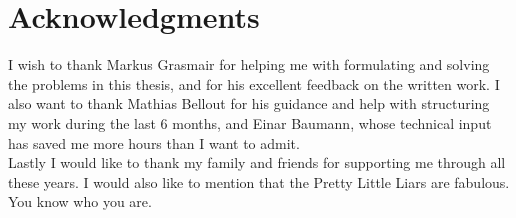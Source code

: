 
\cleardoublepage

\vspace*{\fill}
\noindent\begin{minipage}[c][]{\textwidth}
\section*{Acknowledgments} %
I wish to thank Markus Grasmair for helping me with
formulating and solving the problems in this thesis,
and for his excellent feedback on the written work.
%
I also want to thank Mathias Bellout for his guidance
and help with structuring my work during the last
6 months, and Einar Baumann, whose technical input has
saved me more hours than I want to admit. \\
%
Lastly I would like to thank my family and friends 
for supporting me through all these years. I would 
also like to mention that the Pretty Little Liars 
are fabulous. You know who you are.
\end{minipage}
\vspace*{\fill}
